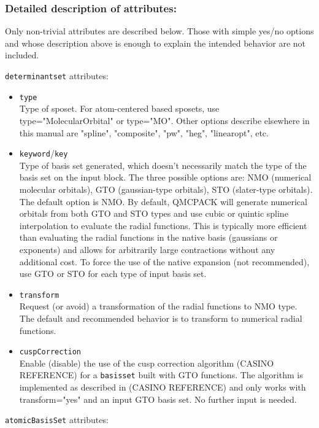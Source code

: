 \subsubsection{Detailed description of attributes:}

Only non-trivial attributes are described below. Those with simple yes/no options and whose description above is enough to explain the intended behavior are not included.

\texttt{determinantset} attributes:

\begin{itemize}
\item \texttt{type} \\
Type of sposet. For atom-centered based sposets, use type="MolecularOrbital" or type="MO". Other options describe elsewhere in this manual are "spline", "composite", "pw", "heg", "linearopt", etc.
\item \texttt{keyword}/\texttt{key} \\
Type of basis set generated, which doesn't necessarily match the type of the basis set on the input block. The three possible options are: NMO (numerical molecular orbitals), GTO (gaussian-type orbitals), STO (slater-type orbitals). The default option is NMO. By default, QMCPACK will generate numerical orbitals from both GTO and STO types and use cubic or quintic spline interpolation to evaluate the radial functions. This is typically more efficient than evaluating the radial functions in the native basis (gaussians or exponents) and allows for arbitrarily large contractions without any additional cost. To force the use of the native expansion (not recommended), use GTO or STO for each type of input basis set.
\item \texttt{transform}\\
Request (or avoid) a transformation of the radial functions to NMO type. The default and recommended behavior is to transform to numerical radial functions.
\item \texttt{cuspCorrection}\\
Enable (disable) the use of the cusp correction algorithm (CASINO REFERENCE) for a \texttt{basisset} built with GTO functions. The algorithm is implemented as described in (CASINO REFERENCE) and only works with transform="yes" and an input GTO basis set. No further input is needed. 
\end{itemize}

\texttt{atomicBasisSet} attributes:

